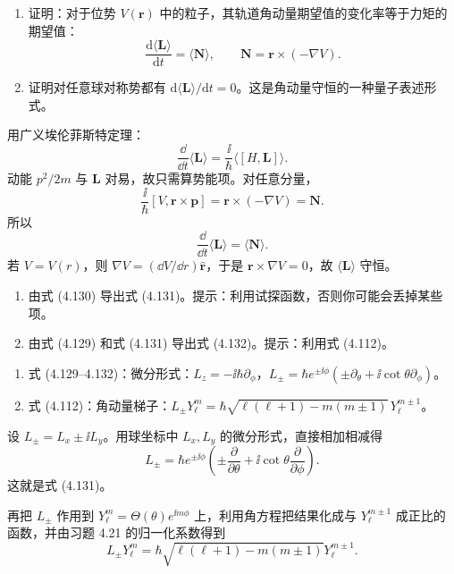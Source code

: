 \begin{question}
\begin{enumerate}
\item 证明：对于位势 $V(\mathbf r)$ 中的粒子，其轨道角动量期望值的变化率等于力矩的期望值：
\[
\frac{\mathrm d\langle\mathbf L\rangle}{\mathrm dt}=\langle\mathbf N\rangle,
\qquad \mathbf N=\mathbf r\times(-\nabla V).
\]
\item 证明对任意球对称势都有 $\mathrm d\langle\mathbf L\rangle/\mathrm dt=0$。这是角动量守恒的一种量子表述形式。
\end{enumerate}
\end{question}
\begin{solution}

用广义埃伦菲斯特定理：
\[
\frac{\dd}{\dd t}\langle\mathbf L\rangle=\frac{\ii}{\hbar}\langle[H,\mathbf L]\rangle.
\]
动能 $p^2/2m$ 与 $\mathbf L$ 对易，故只需算势能项。对任意分量，
\[
\frac{\ii}{\hbar}[V,\mathbf r\times\mathbf p]
=\mathbf r\times(-\nabla V)=\mathbf N.
\]
所以
\[
\frac{\dd}{\dd t}\langle\mathbf L\rangle=\langle\mathbf N\rangle.
\]
若 $V=V(r)$，则 $\nabla V=(\dd V/\dd r)\hat{\mathbf r}$，于是 $\mathbf r\times\nabla V=0$，故 $\langle\mathbf L\rangle$ 守恒。

\end{solution}

\begin{question}
\begin{enumerate}
\item 由式 (4.130) 导出式 (4.131)。提示：利用试探函数，否则你可能会丢掉某些项。
\item 由式 (4.129) 和式 (4.131) 导出式 (4.132)。提示：利用式 (4.112)。
\end{enumerate}

\par\smallskip
{}
\begin{enumerate}[leftmargin=2.2em,itemsep=0.12em,topsep=0.12em,parsep=0pt]
\item 式 (4.129--4.132)：微分形式：$L_z=-\ii\hbar\partial_\phi$，$L_\pm=\hbar e^{\pm\ii\phi}(\pm\partial_\theta+\ii\cot\theta\partial_\phi)$。
\item 式 (4.112)：角动量梯子：$L_\pm Y_\ell^m=\hbar\sqrt{\ell(\ell+1)-m(m\pm1)}\,Y_\ell^{m\pm1}$。
\end{enumerate}

\end{question}
\begin{solution}

设 $L_\pm=L_x\pm\ii L_y$。用球坐标中 $L_x,L_y$ 的微分形式，直接相加相减得
\[
L_\pm=\hbar e^{\pm\ii\phi}\left(\pm\frac{\partial}{\partial\theta}+\ii\cot\theta\frac{\partial}{\partial\phi}\right).
\]
这就是式 (4.131)。

再把 $L_\pm$ 作用到 $Y_\ell^m=\Theta(\theta)e^{\ii m\phi}$ 上，利用角方程把结果化成与 $Y_\ell^{m\pm1}$ 成正比的函数，并由习题 4.21 的归一化系数得到
\[
L_\pm Y_\ell^m=\hbar\sqrt{\ell(\ell+1)-m(m\pm1)}Y_\ell^{m\pm1}.
\]

\end{solution}

